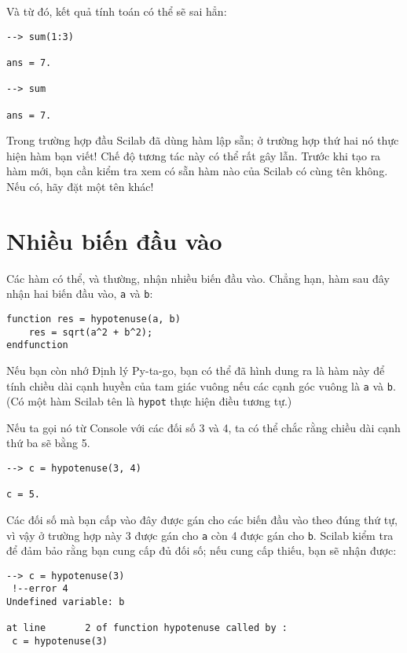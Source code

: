 \documentclass[12pt]{book}
\begin{document}
Và từ đó, kết quả tính toán có thể sẽ sai hẳn:

\begin{verbatim}
--> sum(1:3)

ans = 7.

--> sum

ans = 7.
\end{verbatim}
%
Trong trường hợp đầu Scilab đã dùng hàm lập sẵn; ở trường hợp 
thứ hai nó thực hiện hàm bạn viết! Chế độ tương tác này có thể 
rất gây lẫn. Trước khi tạo ra hàm mới, bạn cần kiểm tra xem
có sẵn hàm nào của Scilab có cùng tên không. Nếu có, hãy đặt
một tên khác!


\section{Nhiều biến đầu vào}
\label{hypotenuse}

Các hàm có thể, và thường, nhận nhiều biến đầu vào. Chẳng hạn,
hàm sau đây nhận hai biến đầu vào, {\tt a} và {\tt b}:

\begin{verbatim}
function res = hypotenuse(a, b)
    res = sqrt(a^2 + b^2);
endfunction
\end{verbatim}

Nếu bạn còn nhớ Định lý Py-ta-go, bạn có thể đã hình dung ra là
hàm này để tính chiều dài cạnh huyền của tam giác vuông nếu các
cạnh góc vuông là {\tt a} và {\tt b}.  (Có một hàm Scilab tên là 
{\tt hypot} thực hiện điều tương tự.)

Nếu ta gọi nó từ Console với các đối số 3 và 4, ta có thể
chắc rằng chiều dài cạnh thứ ba sẽ bằng 5.

\begin{verbatim}
--> c = hypotenuse(3, 4)

c = 5.
\end{verbatim}
Các đối số mà bạn cấp vào đây được gán cho các biến đầu vào theo
đúng thứ tự, vì vậy ở trường hợp này 3 được gán cho {\tt a} còn 4 
được gán cho {\tt b}.  Scilab kiểm tra để đảm bảo rằng bạn cung
cấp đủ đối số; nếu cung cấp thiếu, bạn sẽ nhận được:

\begin{verbatim}
--> c = hypotenuse(3)
 !--error 4 
Undefined variable: b

at line       2 of function hypotenuse called by :  
 c = hypotenuse(3) 
\end{verbatim}

\end{document}

